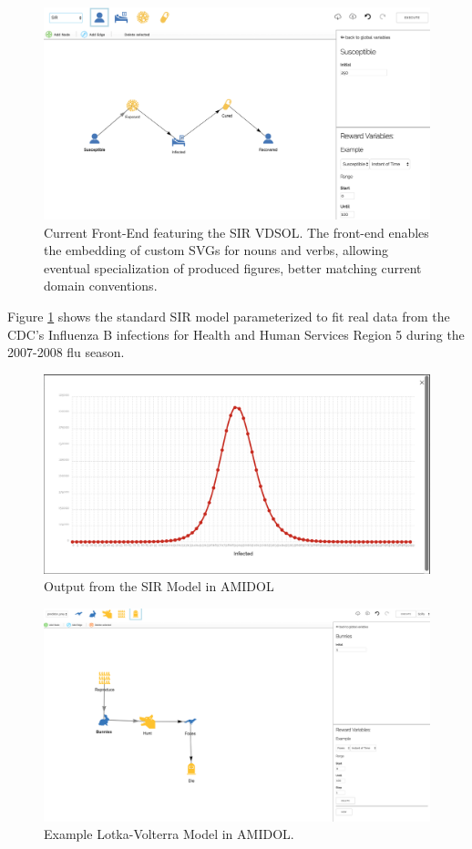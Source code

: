 \documentclass[11pt]{article}
\newcommand{\amidol}{\textsc{AMIDOL}}
\begin{document}
\begin{figure}
\includegraphics[width=\textwidth]{figs/AMIDOL-UI.png}
\caption{Current Front-End featuring the SIR VDSOL.  The front-end enables the embedding of custom SVGs for nouns and verbs, allowing eventual specialization of produced figures, better matching current domain conventions.}
\label{Fig:Editor}
\end{figure}

Figure \ref{Fig:Editor} shows the standard SIR model parameterized to fit real data from the CDC's Influenza B infections for Health and Human Services Region 5 during the 2007-2008 flu season.

\begin{figure}
  \includegraphics[width=\textwidth]{figs/SIR-output.png}
\caption{Output from the SIR Model in \amidol{}}
\label{Fig:SIROut}
\end{figure}

\begin{figure}
\includegraphics[width=\textwidth]{figs/Lotka-Volterra.png}
\caption{Example Lotka-Volterra Model in \amidol{}.}
\label{Fig:Lotka}
\end{figure}
\end{document}
